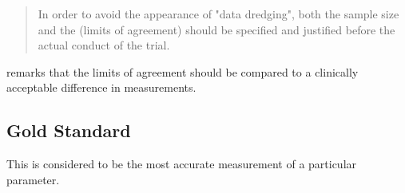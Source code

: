 \documentclass[12pt, a4paper]{report}
\begin{document}
\begin{quote}
	In order to avoid the appearance of "data dredging", both the
	sample size and the (limits of agreement) should be specified and
	justified before the actual conduct of the trial. \citep{lin}
\end{quote}

\citet{Dewitte} remarks that the limits of agreement should be
compared to a clinically acceptable difference in measurements.


\subsection{Gold Standard} This is considered to be the most
accurate measurement of a particular parameter.



\end{document}
